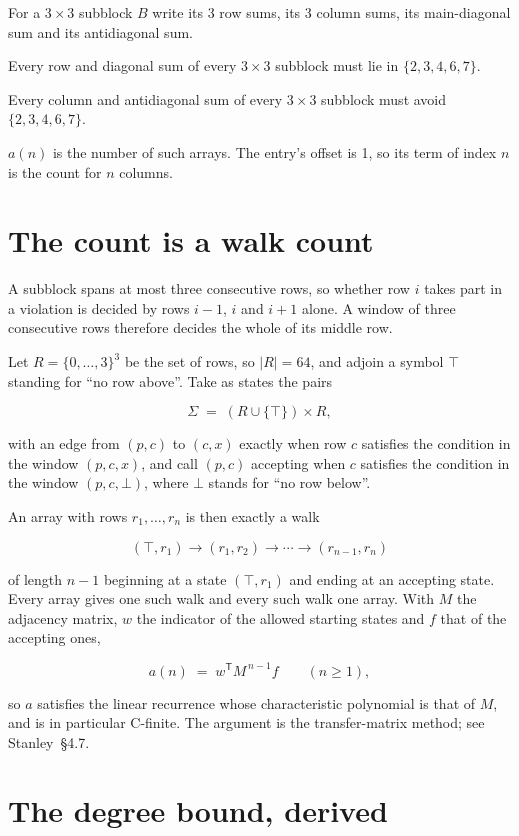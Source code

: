 \documentclass[11pt]{article}
\theoremstyle{definition}
\begin{document}
For a $3\times3$ subblock $B$ write its 3 row sums, its 3 column sums, its main-diagonal sum and its antidiagonal sum.

Every row and diagonal sum of every $3\times3$ subblock must lie in $\{2, 3, 4, 6, 7\}$.

Every column and antidiagonal sum of every $3\times3$ subblock must avoid $\{2, 3, 4, 6, 7\}$.

$a(n)$ is the number of such arrays. The entry's offset is 1, so its term of index $n$ is the count for $n$ columns.

\section{The count is a walk count}

A subblock spans at most three consecutive rows, so whether row $i$ takes part in a violation is decided by rows $i-1$, $i$ and $i+1$ alone. A window of three consecutive rows therefore decides the whole of its middle row.

Let $R = \{0,\dots,3\}^{3}$ be the set of rows, so $|R| = 64$, and adjoin a symbol $\top$ standing for ``no row above''. Take as states the pairs

\[\Sigma \;=\; (R \cup \{\top\}) \times R,\]

with an edge from $(p,c)$ to $(c,x)$ exactly when row $c$ satisfies the condition in the window $(p,c,x)$, and call $(p,c)$ accepting when $c$ satisfies the condition in the window $(p,c,\bot)$, where $\bot$ stands for ``no row below''.

An array with rows $r_1,\dots,r_n$ is then exactly a walk

\[(\top,r_1) \to (r_1,r_2) \to \cdots \to (r_{n-1},r_n)\]

of length $n-1$ beginning at a state $(\top,r_1)$ and ending at an accepting state. Every array gives one such walk and every such walk one array. With $M$ the adjacency matrix, $w$ the indicator of the allowed starting states and $f$ that of the accepting ones,

\[a(n) \;=\; w^{\mathsf T} M^{\,n-1} f \qquad (n \ge 1),\]

so $a$ satisfies the linear recurrence whose characteristic polynomial is that of $M$, and is in particular C-finite. The argument is the transfer-matrix method; see Stanley~\S4.7.

\section{The degree bound, derived}
\end{document}
